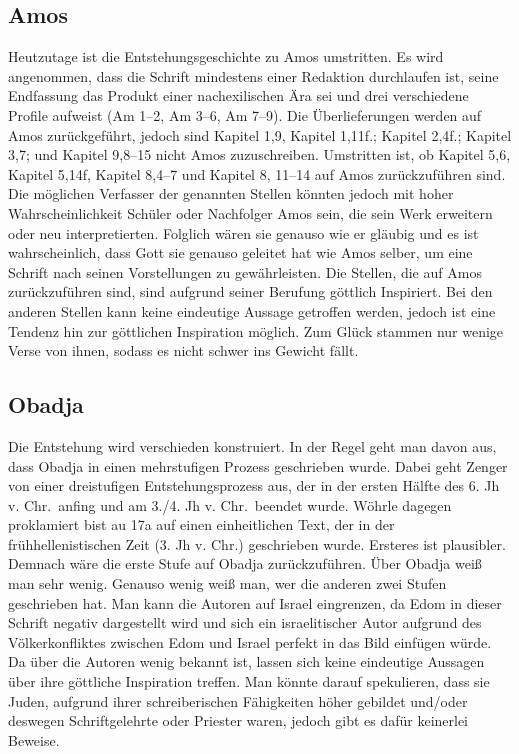 \subsection*{Amos}
Heutzutage ist die Entstehungsgeschichte zu Amos umstritten. Es wird angenommen, dass die Schrift mindestens einer Redaktion durchlaufen ist, seine Endfassung das Produkt einer nachexilischen Ära sei und drei verschiedene Profile aufweist (Am 1--2, Am 3--6, Am 7--9). Die Überlieferungen werden auf Amos zurückgeführt, jedoch sind Kapitel 1,9, Kapitel 1,11f.; Kapitel 2,4f.; Kapitel 3,7;  und Kapitel 9,8--15 nicht Amos zuzuschreiben. Umstritten ist, ob Kapitel 5,6, Kapitel 5,14f, Kapitel 8,4--7 und Kapitel 8, 11--14 auf Amos zurückzuführen sind. Die möglichen Verfasser der genannten Stellen könnten jedoch mit hoher Wahrscheinlichkeit Schüler oder Nachfolger Amos sein, die sein Werk erweitern oder neu interpretierten. Folglich wären sie genauso wie er gläubig und es ist wahrscheinlich, dass Gott sie genauso geleitet hat wie Amos selber, um eine Schrift nach seinen Vorstellungen zu gewährleisten. Die Stellen, die auf Amos zurückzuführen sind, sind aufgrund seiner Berufung göttlich Inspiriert. Bei den anderen Stellen kann keine eindeutige Aussage getroffen werden, jedoch ist eine Tendenz hin zur göttlichen Inspiration möglich. Zum Glück stammen nur wenige Verse von ihnen, sodass es nicht schwer ins Gewicht fällt.

\subsection*{Obadja}
Die Entstehung wird verschieden konstruiert. In der Regel geht man davon aus, dass Obadja in einen mehrstufigen Prozess geschrieben wurde. Dabei geht Zenger von einer dreistufigen Entstehungsprozess aus, der in der ersten Hälfte des 6. Jh v. Chr.\ anfing und am 3./4. Jh v. Chr.\ beendet wurde.	Wöhrle dagegen proklamiert bist au 17a auf einen einheitlichen Text, der in der frühhellenistischen Zeit (3. Jh v. Chr.) geschrieben wurde. Ersteres ist plausibler. Demnach wäre die erste Stufe auf Obadja zurückzuführen. Über Obadja weiß man sehr wenig. Genauso wenig weiß man, wer die anderen zwei Stufen geschrieben hat. Man kann die Autoren auf Israel eingrenzen, da Edom in dieser Schrift negativ dargestellt wird und sich ein israelitischer Autor aufgrund des Völkerkonfliktes zwischen Edom und Israel perfekt in das Bild einfügen würde. Da über die Autoren wenig bekannt ist, lassen sich keine eindeutige Aussagen über ihre göttliche Inspiration treffen. Man könnte darauf spekulieren, dass sie Juden, aufgrund ihrer schreiberischen Fähigkeiten höher gebildet und/oder deswegen Schriftgelehrte oder Priester waren, jedoch gibt es dafür keinerlei Beweise.

